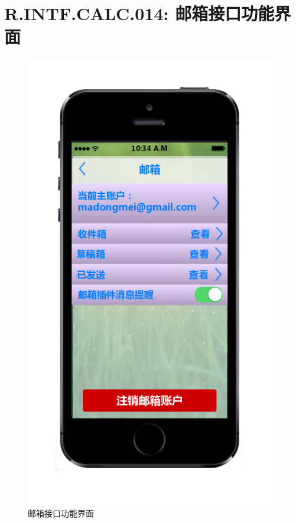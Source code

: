     \section{R.INTF.CALC.014: 邮箱接口功能界面}
    \begin{figure}[h]
        \centering
        \includegraphics[scale=0.6]{OutlineDesign/figures/邮箱接口功能界面.png}
        \caption{邮箱接口功能界面}
        \label{fig:server_flow}
    \end{figure}
    \newpage
